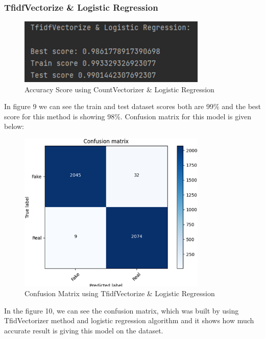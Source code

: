 \documentclass{article}
\begin{document}
    \subsubsection{TfidfVectorize \& Logistic Regression}
    \begin{figure}[!h]
    \centering
    \includegraphics[width=0.8\textwidth]{image9.png}
    \caption{Accuracy Score using CountVectorizer \& Logistic Regression}
    \label{fig:label}
    \end{figure}\break
    In figure 9 we can see the train and test dataset scores both are 99\% and the best score for this method is showing 98\%.  Confusion matrix for this model is given below:\break
    \begin{figure}[!h]
    \centering
    \includegraphics[width=0.8\textwidth]{image10.png}
    \caption{Confusion Matrix using TfidfVectorize \& Logistic Regression}
    \label{fig:label}
    \end{figure}\break
    In the figure 10, we can see the confusion matrix, which was built by using TfidVectorizer method and logistic regression algorithm and it shows how much accurate result is giving this model on the dataset.
\end{document}
